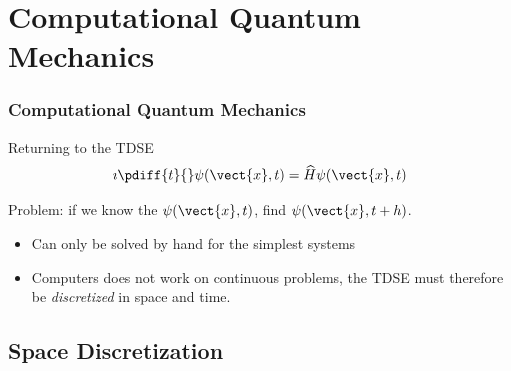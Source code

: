 \documentclass{beamer}
\begin{document}
%
%

\section{Computational Quantum Mechanics}

\begin{frame}
	\frametitle{Computational Quantum Mechanics}

	Returning to the TDSE
	\begin{equation*}
		\imath \pdiff{t}{}\psi(\vect{x},t) = \widehat{H} \psi(\vect{x},t)
	\end{equation*}

	{
		Problem: if we know the $\psi(\vect{x}, t)$, find $\psi(\vect{x}, t+h)$.
	}
	\vspace{0.25cm}


	\begin{itemize}
		\item<3-> Can only be solved by hand for the simplest systems
		\item<4-> Computers does not work on continuous problems, the TDSE must therefore be \emph{discretized} in space and time. 
	\end{itemize}

\end{frame}


\subsection{Space Discretization}
\end{document}
